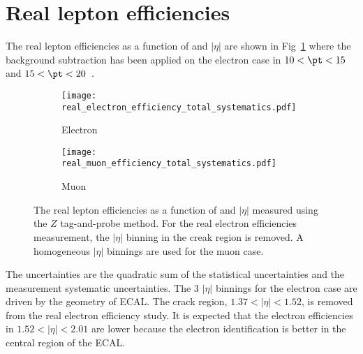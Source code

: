 
\section{Real lepton efficiencies}
\label{sec:app_RLE}
The real lepton efficiencies as a function of \pt and $|\eta|$ are shown in Fig~\ref{fig:app_RLE_real_efficiency_total_systematics} where the background subtraction has been applied on the electron case in $10 < \pt < 15$~{\GeV} and $15 < \pt < 20$~{\GeV}.
%
\begin{figure}[htbp]
    \begin{subfigure}[b]{0.48\textwidth}
        \begin{center}
            \texttt{[image: real\_electron\_efficiency\_total\_systematics.pdf]}
            \caption{Electron}
        \end{center}
    \end{subfigure}
    \begin{subfigure}[b]{0.48\textwidth}
        \begin{center}
            \texttt{[image: real\_muon\_efficiency\_total\_systematics.pdf]}
            \caption{Muon}
        \end{center}
    \end{subfigure}
    \caption{The real lepton efficiencies as a function of \pt and $|\eta|$ measured using the $Z$ tag-and-probe method.
    For the real electron efficiencies measurement, the $|\eta|$ binning in the creak region is removed.
    A homogeneous $|\eta|$ binnings are used for the muon case.}
    \label{fig:app_RLE_real_efficiency_total_systematics}
\end{figure}
%
The uncertainties are the quadratic sum of the statistical uncertainties and the measurement systematic uncertainties.
The 3 $|\eta|$ binnings for the electron case are driven by the geometry of ECAL.
The crack region, $1.37<|\eta|<1.52$, is removed from the real electron efficiency study.
It is expected that the electron efficiencies in $1.52<|\eta|<2.01$ are lower because the electron identification is better in the central region of the ECAL.


